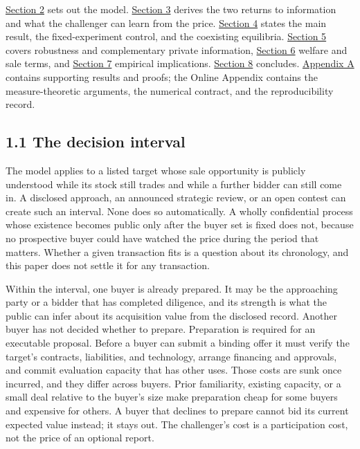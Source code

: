 \documentclass[
  12pt,
]{article}
\begin{document}
\hyperref[sec-model]{Section 2} sets out the model.
\hyperref[sec-payoffs]{Section 3} derives the two returns to information
and what the challenger can learn from the price.
\hyperref[sec-results]{Section 4} states the main result, the
fixed-experiment control, and the coexisting equilibria.
\hyperref[sec-extensions]{Section 5} covers robustness and complementary
private information, \hyperref[sec-welfare]{Section 6} welfare and sale
terms, and \hyperref[sec-program]{Section 7} empirical implications.
\hyperref[sec-conclusion]{Section 8} concludes.
\hyperref[paper-appendix]{Appendix A} contains supporting results and
proofs; the Online Appendix contains the measure-theoretic arguments,
the numerical contract, and the reproducibility record.

\subsection{1.1 The decision interval}\label{sec-the-decision-interval}

The model applies to a listed target whose sale opportunity is publicly
understood while its stock still trades and while a further bidder can
still come in. A disclosed approach, an announced strategic review, or
an open contest can create such an interval. None does so automatically.
A wholly confidential process whose existence becomes public only after
the buyer set is fixed does not, because no prospective buyer could have
watched the price during the period that matters. Whether a given
transaction fits is a question about its chronology, and this paper does
not settle it for any transaction.

Within the interval, one buyer is already prepared. It may be the
approaching party or a bidder that has completed diligence, and its
strength is what the public can infer about its acquisition value from
the disclosed record. Another buyer has not decided whether to prepare.
Preparation is required for an executable proposal. Before a buyer can
submit a binding offer it must verify the target's contracts,
liabilities, and technology, arrange financing and approvals, and commit
evaluation capacity that has other uses. Those costs are sunk once
incurred, and they differ across buyers. Prior familiarity, existing
capacity, or a small deal relative to the buyer's size make preparation
cheap for some buyers and expensive for others. A buyer that declines to
prepare cannot bid its current expected value instead; it stays out. The
challenger's cost is a participation cost, not the price of an optional
report.
\end{document}
